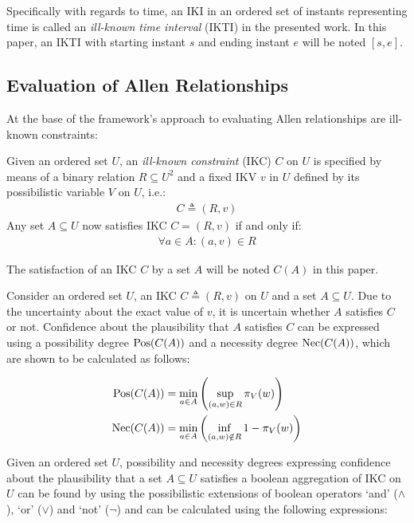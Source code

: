 Specifically with regards to time, an IKI in an ordered set of instants representing time is called an \emph{ill-known time interval} (IKTI) in the presented work. In this paper, an IKTI with starting instant $s$ and ending instant $e$ will be noted $\left[s, e\right]$.

\subsection{\label{subsec:ikc-evaluation}Evaluation of Allen Relationships}
At the base of the framework's approach to evaluating Allen relationships are ill-known constraints:

\begin{definition}
Given an ordered set $U$, an \emph{ill-known constraint} (IKC) $C$ on $U$ is specified by means of a binary relation $R \subseteq U^{2}$ and a fixed IKV $v$ in $U$ defined by its possibilistic variable $V$ on $U$, i.e.:
\begin{align}
C \triangleq (R,v) \nonumber
\end{align}
Any set $A \subseteq U$ now satisfies IKC $C = (R,v)$ if and only if:
\begin{align}
\forall a \in A : (a,v) \in R \nonumber
\end{align}
\end{definition}

The satisfaction of an IKC $C$ by a set $A$ will be noted $C(A)$ in this paper. 

Consider an ordered set $U$, an IKC $C \triangleq (R,v)$ on $U$ and a set $A \subseteq U$. Due to the uncertainty about the exact value of $v$, it is uncertain whether $A$ satisfies $C$ or not. Confidence about the plausibility that $A$ satisfies $C$ can be expressed using a possibility degree $\operatorname{Pos}(C(A))$ and a necessity degree $\operatorname{Nec}(C(A))$, which are shown to be calculated as follows:

\begin{align}
\operatorname{Pos}(C(A)) & = \min_{a \in A}\left(\sup_{(a,w) \in R}\pi_{V}(w)\right) \label{ill-known-pos}\\
\operatorname{Nec}(C(A)) & = \min_{a \in A}\left(\inf_{(a,w) \notin R} 1-\pi_{V}(w)\right) \label{ill-known-nec}
\end{align}

Given an ordered set $U$, possibility and necessity degrees expressing confidence about the plausibility that a set $A \subseteq U$ satisfies a boolean aggregation of IKC on $U$ can be found by using the possibilistic extensions of boolean operators `and' ($\wedge$), `or' ($\vee$) and `not' ($\neg$) and can be calculated using the following expressions:

